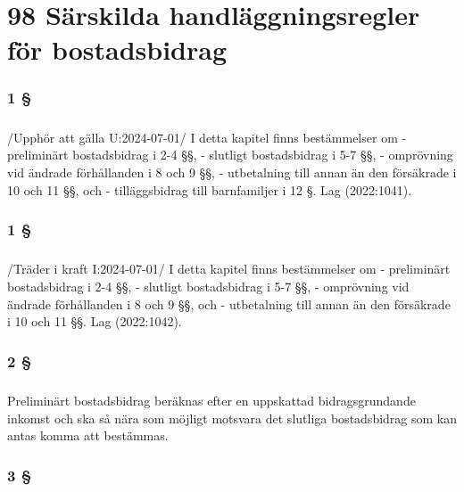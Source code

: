 \documentclass[a4paper,notitlepage,openany,10pt]{book}
\begin{document}
\chapter*{98 Särskilda handläggningsregler för bostadsbidrag}
\subsection*{1 §}
\paragraph*{}
/Upphör att gälla U:2024-07-01/
I detta kapitel finns bestämmelser om
\newline - preliminärt bostadsbidrag i 2-4 §§,
\newline - slutligt bostadsbidrag i 5-7 §§,
\newline - omprövning vid ändrade förhållanden i 8 och 9 §§,
\newline - utbetalning till annan än den försäkrade i 10 och 11 §§, och
\newline - tilläggsbidrag till barnfamiljer i 12 §.
Lag (2022:1041).
\subsection*{1 §}
\paragraph*{}
/Träder i kraft I:2024-07-01/
I detta kapitel finns bestämmelser om
\newline - preliminärt bostadsbidrag i 2-4 §§,
\newline - slutligt bostadsbidrag i 5-7 §§,
\newline - omprövning vid ändrade förhållanden i 8 och 9 §§, och
\newline - utbetalning till annan än den försäkrade i 10 och 11 §§.
Lag (2022:1042).
\subsection*{2 §}
\paragraph*{}
Preliminärt bostadsbidrag beräknas efter en uppskattad bidragsgrundande inkomst och ska så nära som möjligt motsvara det slutliga bostadsbidrag som kan antas komma att bestämmas.
\subsection*{3 §}
\end{document}
